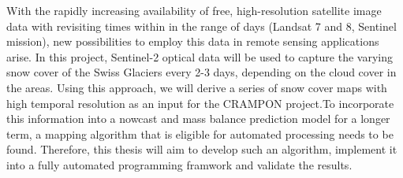 \documentclass[12pt]{article}
\begin{document}
With the rapidly increasing availability of free, high-resolution satellite image data with revisiting times within in the range of days (Landsat 7 and 8, Sentinel mission), new possibilities to employ this data in remote sensing applications arise. In this project, Sentinel-2 optical data will be used to capture the varying snow cover of the Swiss Glaciers every 2-3 days, depending on the cloud cover in the areas. Using this approach, we will derive a series of snow cover maps with high temporal resolution as an input for the CRAMPON project.To incorporate this information into a nowcast and mass balance prediction model for a longer term, a mapping algorithm that is eligible for automated processing needs to be found. Therefore, this thesis will aim to develop such an algorithm, implement it into a fully automated programming framwork and validate the results.
\end{document}
